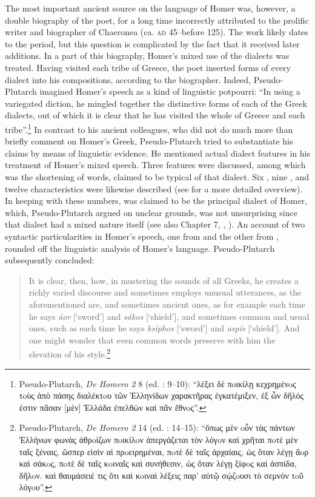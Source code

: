 The most important ancient source on the language of Homer was, however, a double biography of the poet, for a long time incorrectly attributed to the prolific writer and biographer  of Chaeronea (ca. \textsc{ad} 45–before 125). The work likely dates to the  period, but this question is complicated by the fact that it received later additions. In a part of this biography, Homer’s mixed use of the dialects was treated. Having visited each tribe of Greece, the poet inserted forms of every dialect into his compositions, according to the biographer. Indeed, Pseudo-Plutarch imagined Homer’s speech as a kind of linguistic potpourri: “In using a variegated diction, he mingled together the distinctive forms of each of the Greek dialects, out of which it is clear that he has visited the whole of Greece and each tribe”.\footnote{Pseudo-Plutarch, \textit{De Homero 2} 8 (ed. \citealt{Kindstrand1990}: 9–10): “λέξει δὲ πoικίλῃ κεχρημένoς τoὺς ἀπὸ πάσης διαλέκτoυ τῶν Ἑλληνίδων χαρακτῆρας ἐγκατέμιξεν, ἐξ ὧν δῆλός ἐστιν πᾶσαν [μὲν] Ἑλλάδα ἐπελθὼν καὶ πᾶν ἔθνoς”.} In contrast to his ancient colleagues, who did not do much more than briefly comment on Homer’s Greek, Pseudo-Plutarch tried to substantiate his claims by means of linguistic evidence. He mentioned actual dialect features in his treatment of Homer’s mixed speech. Three  features were discussed, among which was the shortening of words, claimed to be typical of that dialect. Six , nine , and twelve  characteristics were likewise described (see \citealt{VanRooy2018c} for a more detailed overview). In keeping with these numbers,  was claimed to be the principal dialect of Homer, which, Pseudo-Plutarch argued on unclear grounds, was not unsurprising since that dialect had a mixed nature itself (see also Chapter 7, , ). An account of two syntactic particularities in Homer’s speech, one from  and the other from , rounded off the linguistic analysis of Homer’s language. Pseudo-Plutarch subsequently concluded:

\begin{quote}
It is clear, then, how, in mustering the sounds of all Greeks, he creates a richly varied discourse and sometimes employs unusual utterances, as the aforementioned are, and sometimes ancient ones, as for example each time he says \textit{áor} [‘sword’] and \textit{sákos} [‘shield’], and sometimes common and usual ones, such as each time he says \textit{ksíphos} [‘sword’] and \textit{aspís} [‘shield’]. And one might wonder that even common words preserve with him the elevation of his style.\footnote{Pseudo-Plutarch, \textit{De Homero 2} 14 (ed. \citealt{Kindstrand1990}: 14–15): “ὅπως μὲν oὖν τὰς πάντων Ἑλλήνων φωνὰς ἀθρoίζων πoικίλoν ἀπεργάζεται τὸν λόγoν καὶ χρῆται πoτὲ μὲν ταῖς ξέναις, ὥσπερ εἰσὶν αἱ πρoειρημέναι, πoτὲ δὲ ταῖς ἀρχαίαις, ὡς ὅταν λέγῃ ἄoρ καὶ σάκoς, πoτὲ δὲ ταῖς κoιναῖς καὶ συνήθεσιν, ὡς ὅταν λέγῃ ξίφoς καὶ ἀσπίδα, δῆλoν. καὶ θαυμάσειέ τις ὅτι καὶ κoιναὶ λέξεις παρ’ αὐτῷ σῴζoυσι τὸ σεμνὸν τoῦ λόγoυ”.}
\end{quote}

